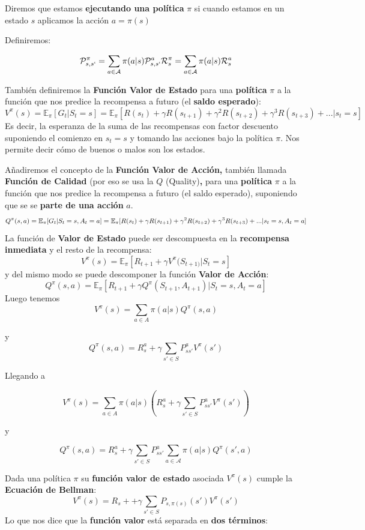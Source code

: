 \documentclass[
  a4paper,
  DIV=11,
  numbers=noendperiod]{scrreprt}
\begin{document}
Diremos que estamos \textbf{ejecutando una política} \(\pi\) si cuando
estamos en un estado \(s\) aplicamos la acción \(a=\pi(s)\)

Definiremos:

\[
\mathcal P_{s,s`}^\pi = \sum_{a \in \mathcal A}\pi(a|s)\mathcal P_{s,s`}^a \\
\mathcal R_{s}^\pi = \sum_{a \in \mathcal A}\pi(a|s)\mathcal R_{s}^a 
\]

También definiremos la \textbf{Función Valor de Estado} para una
\textbf{política} \(\pi\) a la función que nos predice la recompensa a
futuro (el \textbf{saldo esperado}):
\[V^{\pi}(s)=\mathbb E_\pi[G_t|S_t=s]=
\mathbb E_\pi[R(s_t) + \gamma R(s_{t+1}) + \gamma^2 R(s_{t+2}) + \gamma^3 R(s_{t+3}) + ...|s_t=s]\]
Es decir, la esperanza de la suma de las recompensas con factor
descuento suponiendo el comienzo en \(s_t=s\) y tomando las acciones
bajo la política \(\pi\). Nos permite decir cómo de buenos o malos son
los estados.

Añadiremos el concepto de la \textbf{Función Valor de Acción,} también
llamada \textbf{Función de Calidad} (por eso se usa la \(Q\)
(Quality)\textbf{,} para una \textbf{política} \(\pi\) a la función que
nos predice la recompensa a futuro (el saldo esperado), suponiendo que
se se \textbf{parte de una acción} \(a\). \[
Q^\pi(s,a)=\mathbb E_\pi[G_t|S_t=s,A_t=a]\\
=\mathbb E_\pi[R(s_t) + \gamma R(s_{t+1}) + \gamma^2 R(s_{t+2}) + \gamma^3 R(s_{t+3}) + ...|s_t=s,A_t=a]
\] La función de \textbf{Valor de Estado} puede ser descompuesta en la
\textbf{recompensa inmediata} y el resto de la recompensa: \[
V^\pi(s) = \mathbb E_\pi[R_{t+1}+\gamma V^\pi(S_{t+1)}|S_t=s]
\] y del mismo modo se puede descomponer la función \textbf{Valor de
Acción}: \[
Q^\pi(s,a) = \mathbb E_\pi[R_{t+1}+\gamma Q^\pi(S_{t+1}, A_{t+1})|S_t=s,A_t=a]
\] Luego tenemos \[
V^\pi(s) = \sum_{a\in A}\pi(a|s)Q^\pi(s,a)
\]

y \[
Q^\pi(s,a) = R_s^a+\gamma \sum_{s'\in S} P_{ss'}^{a}V^\pi(s')
\]

Llegando a

\[
V^\pi(s) = \sum_{a\in A}\pi(a|s)(R_s^a+\gamma \sum_{s'\in S} P_{ss'}^{a}V^\pi(s'))
\]

y

\[
Q^\pi(s,a) = R_s^a+\gamma \sum_{s'\in S} P_{ss'}^{a}\sum_{a \in \mathcal A} \pi (a|s)Q^\pi(s',a)
\]

Dada una política \(\pi\) su \textbf{función valor de estado} asociada
\(V^{\pi}(s)\) cumple la \textbf{Ecuación de Bellman}:
\[V^{\pi}(s)=R_s+ + \gamma\sum_{s'\in S}P_{s,\pi(s)}(s')V^{\pi}(s')\] Lo
que nos dice que la \textbf{función valor} está separada en \textbf{dos
términos}:
\end{document}
